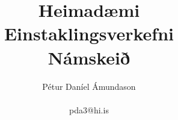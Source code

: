 \documentclass[]{article}
\begin{document}
\title{Heimadæmi  \\ Einstaklingsverkefni \\ Námskeið}
\author{Pétur Daníel Ámundason \\ \\ pda3@hi.is}
\maketitle
\end{document}
